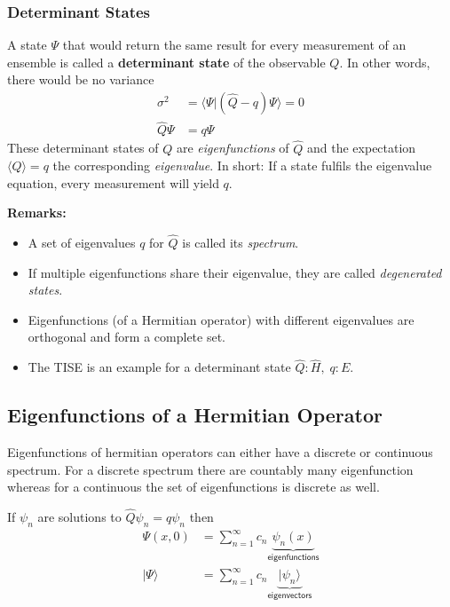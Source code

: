 \subsubsection{Determinant States}
A state $\Psi$ that would return the same result for every measurement of an ensemble is called a \textbf{determinant state} of the observable $Q$.
In other words, there would be no variance
\noindent\begin{align*}
    \sigma^2     & = \langle \Psi|(\hat{Q} - q) \Psi\rangle = 0 \\
    \hat{Q} \Psi & = q \Psi
\end{align*}
These determinant states of $Q$ are \textit{eigenfunctions} of $\hat{Q}$ and the expectation $\langle Q\rangle = q$ the corresponding \textit{eigenvalue}.
\newpar{}
In short: If a state fulfils the eigenvalue equation, every measurement will yield $q$.

\textbf{Remarks:}
\begin{itemize}
    \item A set of eigenvalues $q$ for $\hat{Q}$ is called its \textit{spectrum}.
    \item If multiple eigenfunctions share their eigenvalue, they are called \textit{degenerated states}.
    \item Eigenfunctions (of a Hermitian operator) with different eigenvalues are orthogonal and form a complete set.
    \item The TISE is an example for a determinant state\newline
          $\hat{Q}: \hat{H},\; q:E$.
\end{itemize}

\subsection{Eigenfunctions of a Hermitian Operator}
Eigenfunctions of hermitian operators can either have a discrete or continuous spectrum. For a discrete spectrum there are countably many eigenfunction whereas for a continuous the set of eigenfunctions is discrete as well.

\newpar{}

If $\psi_n$ are solutions to $\hat{Q}\psi_n=q\psi_n$ then
\noindent\begin{align*}
    \Psi(x,0)    & = \sum_{n=1}^{\infty} c_n \underbrace{\psi_n(x)}_{\textsf{eigenfunctions}}    \\
    |\Psi\rangle & = \sum_{n=1}^{\infty} c_n \underbrace{|\psi_n\rangle}_{\textsf{eigenvectors}}
\end{align*}

